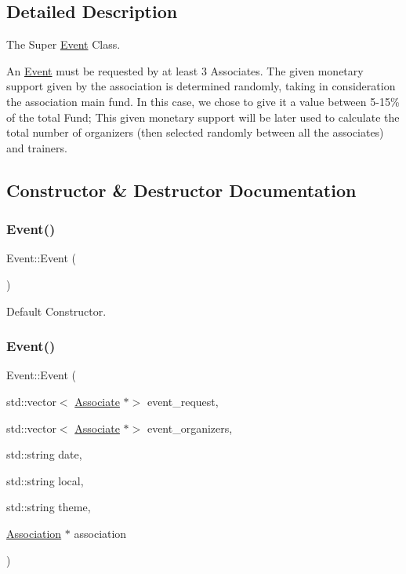 \subsection{Detailed Description}
The Super \hyperlink{classEvent}{Event} Class. 

An \hyperlink{classEvent}{Event} must be requested by at least 3 Associates. The given monetary support given by the association is determined randomly, taking in consideration the association main fund. In this case, we chose to give it a value between 5-\/15\% of the total Fund; This given monetary support will be later used to calculate the total number of organizers (then selected randomly between all the associates) and trainers. 

\subsection{Constructor \& Destructor Documentation}
\mbox{\label{classEvent_a5a40dd4708297f7031e29b39e039ae10}} 
\subsubsection{\texorpdfstring{Event()}{Event()}\hspace{0.1cm}{\footnotesize\ttfamily [1/2]}}
{\footnotesize\ttfamily Event\+::\+Event (\begin{DoxyParamCaption}{ }\end{DoxyParamCaption})}



Default Constructor. 

\mbox{\label{classEvent_af5dc5a200023c83243ab755e69eb4827}} 
\subsubsection{\texorpdfstring{Event()}{Event()}\hspace{0.1cm}{\footnotesize\ttfamily [2/2]}}
{\footnotesize\ttfamily Event\+::\+Event (\begin{DoxyParamCaption}\item[{std\+::vector$<$ \hyperlink{classAssociate}{Associate} $\ast$$>$}]{event\+\_\+request,  }\item[{std\+::vector$<$ \hyperlink{classAssociate}{Associate} $\ast$$>$}]{event\+\_\+organizers,  }\item[{std\+::string}]{date,  }\item[{std\+::string}]{local,  }\item[{std\+::string}]{theme,  }\item[{\hyperlink{classAssociation}{Association} $\ast$}]{association }\end{DoxyParamCaption})}



